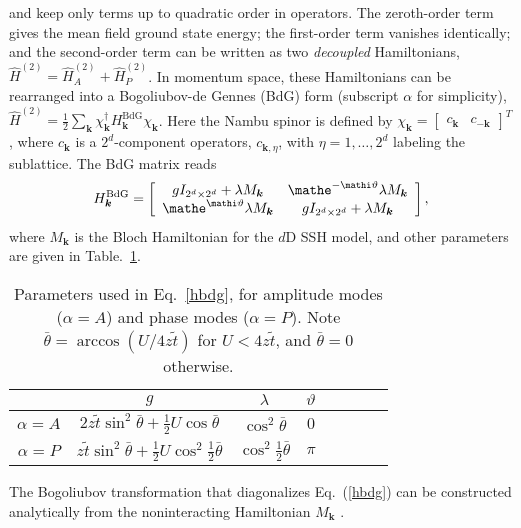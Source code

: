 and keep only terms up to quadratic order in operators.
The zeroth-order term gives the mean field ground state energy;
the first-order term vanishes identically;
and the second-order term can be written as two \emph{decoupled} Hamiltonians,
$\hat{H}^{(2)} = \hat{H}_{A}^{(2)} + \hat{H}_{P}^{(2)}$.
In momentum space,
these Hamiltonians can be rearranged into a Bogoliubov-de Gennes (BdG) form (subscript $\alpha$ for simplicity),
$\hat{H}^{(2)} = \frac{1}{2} \sum_{\bm{k}}\chi^{\dag}_{\bm{k}} H^{\text{BdG}}_{\bm{k}} \chi_{\bm{k}}$.
Here the Nambu spinor is defined by $\chi_{\bm{k}} = \left[\begin{array}{cc}
c_{\bm{k}} & c_{-\bm{k}}
\end{array}\right]^T$,
where $c_{\bm{k}}$ is a $2^d$-component operators,
$c_{\bm{k}, \eta}$,
with $\eta = 1, \ldots, 2^d$ labeling the sublattice.
The BdG matrix reads
\begin{equation}
  H^{\text{BdG}}_{\bm{k}} = \left[\begin{array}{cc}
    gI_{2^d\times 2^d} + \lambda M_{\bm{k}} & \mathe^{- \mathi \vartheta} \lambda M_{\bm{k}}\\
    \mathe^{\mathi \vartheta} \lambda M_{\bm{k}} & gI_{2^d\times 2^d} + \lambda M_{\bm{k}}
  \end{array}\right], \label{hbdg}
\end{equation}
where $M_{\bm{k}}$ is the Bloch Hamiltonian for the $d$D SSH model, and other parameters are given in Table.~\ref{tab:parameters}.%
\begin{table}[b]
\caption{\label{tab:parameters}
Parameters used in Eq.~\eqref{hbdg}, for amplitude modes ($\alpha = A$) and phase modes ($\alpha = P$). Note $\bar\theta=\arccos(U/4z\tilde t)$ for $U<4z\tilde t$, and $\bar\theta =0$ otherwise.}
\begin{ruledtabular}
\begin{tabular}{cccccccc}
 &$g$ &$\lambda$ &$\vartheta$\\
\hline
$\alpha=A$ & $2z\tilde t \sin^2\bar\theta +\frac{1}{2}U\cos\bar\theta$ & $\cos^2\bar\theta$ & $0$ \\
$\alpha=P$ & $z\tilde t\sin^2\bar\theta + \frac{1}{2}U\cos^2\frac{1}{2}\bar\theta$ & $\cos^2\frac{1}{2}\bar\theta$ & $\pi$
\end{tabular}
\end{ruledtabular}
\end{table}
The Bogoliubov transformation that diagonalizes Eq.~(\ref{hbdg}) can be constructed analytically from the noninteracting Hamiltonian $M_{\bm{k}}$ \cite{Kumar2020}.
